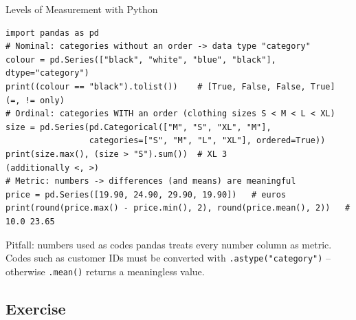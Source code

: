 \documentclass[aspectratio=169,11pt]{beamer}
\begin{document}
\begin{frame}[fragile]{Levels of Measurement with Python}
  \lstset{aboveskip=2pt,belowskip=2pt}
\begin{lstlisting}[keepspaces=true]
import pandas as pd
# Nominal: categories without an order -> data type "category"
colour = pd.Series(["black", "white", "blue", "black"], dtype="category")
print((colour == "black").tolist())    # [True, False, False, True]   (=, != only)
# Ordinal: categories WITH an order (clothing sizes S < M < L < XL)
size = pd.Series(pd.Categorical(["M", "S", "XL", "M"],
                 categories=["S", "M", "L", "XL"], ordered=True))
print(size.max(), (size > "S").sum())  # XL 3                         (additionally <, >)
# Metric: numbers -> differences (and means) are meaningful
price = pd.Series([19.90, 24.90, 29.90, 19.90])   # euros
print(round(price.max() - price.min(), 2), round(price.mean(), 2))   # 10.0 23.65
\end{lstlisting}
  \begin{alertblock}{Pitfall: numbers used as codes}
    pandas treats every number column as metric. Codes such as customer IDs must be
    converted with \texttt{.astype("category")} -- otherwise \texttt{.mean()} returns a meaningless value.
  \end{alertblock}
\end{frame}

\subsection{Exercise}
\end{document}
